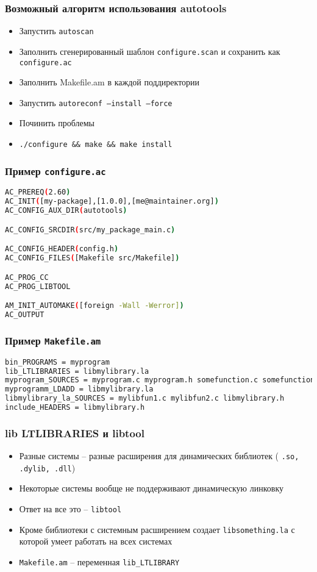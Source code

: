\begin{frame}[fragile]
 \frametitle{Возможный алгоритм использования autotools}
 \begin{itemize}
  \item Запустить \texttt{autoscan}
  \item Заполнить сгенерированный шаблон \texttt{configure.scan} и сохранить как \texttt{configure.ac}
  \item Заполнить Makefile.am в каждой поддиректории
  \item Запустить \texttt{autoreconf --install --force}
  \item Починить проблемы
  \item \verb+./configure && make && make install+
 \end{itemize}
\end{frame}

\begin{frame}[fragile]
\frametitle{Пример \texttt{configure.ac}}
\begin{lstlisting}[language=sh]
AC_PREREQ(2.60)
AC_INIT([my-package],[1.0.0],[me@maintainer.org])
AC_CONFIG_AUX_DIR(autotools)

AC_CONFIG_SRCDIR(src/my_package_main.c)

AC_CONFIG_HEADER(config.h)
AC_CONFIG_FILES([Makefile src/Makefile])

AC_PROG_CC
AC_PROG_LIBTOOL

AM_INIT_AUTOMAKE([foreign -Wall -Werror])
AC_OUTPUT
\end{lstlisting}
\end{frame}

\begin{frame}[fragile]
\frametitle{Пример \texttt{Makefile.am}}
\begin{lstlisting}[language=sh]
bin_PROGRAMS = myprogram
lib_LTLIBRARIES = libmylibrary.la
myprogram_SOURCES = myprogram.c myprogram.h somefunction.c somefunction.h
myprogramm_LDADD = libmylibrary.la 
libmylibrary_la_SOURCES = mylibfun1.c mylibfun2.c libmylibrary.h
include_HEADERS = libmylibrary.h
\end{lstlisting}
\end{frame}

\begin{frame}[fragile]
\frametitle{lib LTLIBRARIES и libtool}
\begin{itemize}
 \item Разные системы -- разные расширения для динамических библиотек (
\texttt{.so, .dylib, .dll})
 \item Некоторые системы вообще не поддерживают динамическую линковку
 \item Ответ на все это -- \texttt{libtool}
 \item Кроме библиотеки с системным расширением создает \texttt{libsomething.la} с которой умеет работать на всех системах
 \item \texttt{Makefile.am} -- переменная \verb+lib_LTLIBRARY+ 
\end{itemize}
\end{frame}

